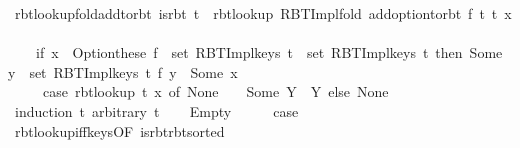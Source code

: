 \begin{isabellebody}
\endisatagproof
{\isafoldproof}%
%
\isadelimproof
\isanewline
%
\endisadelimproof
\isanewline
{}\isamarkupfalse%
\ rbt{\isacharunderscore}{\kern0pt}lookup{\isacharunderscore}{\kern0pt}fold{\isacharunderscore}{\kern0pt}add{\isacharunderscore}{\kern0pt}to{\isacharunderscore}{\kern0pt}rbt{\isacharcolon}{\kern0pt}\ {\isachardoublequoteopen}is{\isacharunderscore}{\kern0pt}rbt\ t{\isacharprime}{\kern0pt}\ {\isasymLongrightarrow}\ rbt{\isacharunderscore}{\kern0pt}lookup\ {\isacharparenleft}{\kern0pt}RBT{\isacharunderscore}{\kern0pt}Impl{\isachardot}{\kern0pt}fold\ {\isacharparenleft}{\kern0pt}add{\isacharunderscore}{\kern0pt}option{\isacharunderscore}{\kern0pt}to{\isacharunderscore}{\kern0pt}rbt\ f{\isacharparenright}{\kern0pt}\ t\ t{\isacharprime}{\kern0pt}{\isacharparenright}{\kern0pt}\ x\ {\isacharequal}{\kern0pt}\isanewline
\ \ \ \ {\isacharparenleft}{\kern0pt}if\ x\ {\isasymin}\ Option{\isachardot}{\kern0pt}these\ {\isacharparenleft}{\kern0pt}f\ {\isacharbackquote}{\kern0pt}\ set\ {\isacharparenleft}{\kern0pt}RBT{\isacharunderscore}{\kern0pt}Impl{\isachardot}{\kern0pt}keys\ t{\isacharparenright}{\kern0pt}{\isacharparenright}{\kern0pt}\ {\isasymunion}\ set\ {\isacharparenleft}{\kern0pt}RBT{\isacharunderscore}{\kern0pt}Impl{\isachardot}{\kern0pt}keys\ t{\isacharprime}{\kern0pt}{\isacharparenright}{\kern0pt}\ then\ Some\ {\isacharparenleft}{\kern0pt}{\isacharbraceleft}{\kern0pt}y\ {\isasymin}\ set\ {\isacharparenleft}{\kern0pt}RBT{\isacharunderscore}{\kern0pt}Impl{\isachardot}{\kern0pt}keys\ t{\isacharparenright}{\kern0pt}{\isachardot}{\kern0pt}\ f\ y\ {\isacharequal}{\kern0pt}\ Some\ x{\isacharbraceright}{\kern0pt}\isanewline
\ \ \ \ {\isasymunion}\ {\isacharparenleft}{\kern0pt}case\ rbt{\isacharunderscore}{\kern0pt}lookup\ t{\isacharprime}{\kern0pt}\ x\ of\ None\ {\isasymRightarrow}\ {\isacharbraceleft}{\kern0pt}{\isacharbraceright}{\kern0pt}\ {\isacharbar}{\kern0pt}\ Some\ Y\ {\isasymRightarrow}\ Y{\isacharparenright}{\kern0pt}{\isacharparenright}{\kern0pt}\ else\ None{\isacharparenright}{\kern0pt}{\isachardoublequoteclose}\isanewline
%
\isadelimproof
%
\endisadelimproof
%
\isatagproof
{}\isamarkupfalse%
\ {\isacharparenleft}{\kern0pt}induction\ t\ arbitrary{\isacharcolon}{\kern0pt}\ t{\isacharprime}{\kern0pt}{\isacharparenright}{\kern0pt}\isanewline
\ \ \isamarkupfalse%
\ Empty\isanewline
\ \ \isamarkupfalse%
\ \isamarkupfalse%
\ {\isacharquery}{\kern0pt}case\isanewline
\ \ \ \ \isamarkupfalse%
\ rbt{\isacharunderscore}{\kern0pt}lookup{\isacharunderscore}{\kern0pt}iff{\isacharunderscore}{\kern0pt}keys{\isacharparenleft}{\kern0pt}{}{\isacharcomma}{\kern0pt}{}{\isacharparenright}{\kern0pt}{\isacharbrackleft}{\kern0pt}OF\ is{\isacharunderscore}{\kern0pt}rbt{\isacharunderscore}{\kern0pt}rbt{\isacharunderscore}{\kern0pt}sorted{\isacharbrackright}{\kern0pt}\isanewline

\end{isabellebody}
